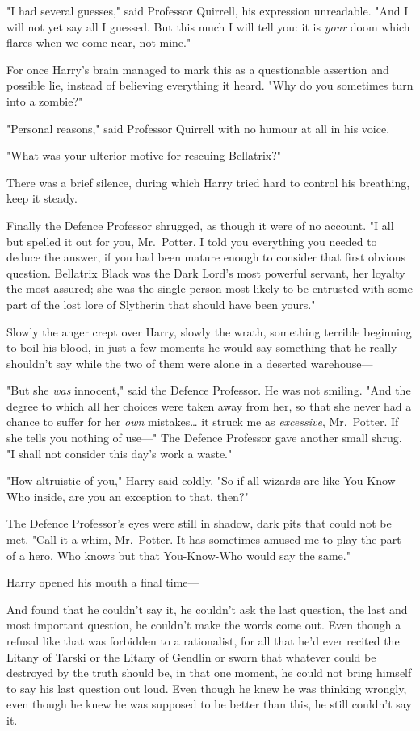 "I had several guesses," said Professor Quirrell, his expression unreadable.
"And I will not yet say all I guessed. But this much I will tell you: it is
\emph{your} doom which flares when we come near, not mine."

For once Harry's brain managed to mark this as a questionable assertion and
possible lie, instead of believing everything it heard. "Why do you sometimes
turn into a zombie?"

"Personal reasons," said Professor Quirrell with no humour at all in his voice.

"What was your ulterior motive for rescuing Bellatrix?"

There was a brief silence, during which Harry tried hard to control his
breathing, keep it steady.

Finally the Defence Professor shrugged, as though it were of no account. "I all
but spelled it out for you, Mr.~Potter. I told you everything you needed to
deduce the answer, if you had been mature enough to consider that first obvious
question. Bellatrix Black was the Dark Lord's most powerful servant, her
loyalty the most assured; she was the single person most likely to be entrusted
with some part of the lost lore of Slytherin that should have been yours."

Slowly the anger crept over Harry, slowly the wrath, something terrible
beginning to boil his blood, in just a few moments he would say something that
he really shouldn't say while the two of them were alone in a deserted
warehouse---

"But she \emph{was} innocent," said the Defence Professor. He was not smiling.
"And the degree to which all her choices were taken away from her, so that she
never had a chance to suffer for her \emph{own} mistakes{\ldots} it struck me
as \emph{excessive}, Mr.~Potter. If she tells you nothing of use---" The
Defence Professor gave another small shrug. "I shall not consider this day's
work a waste."

"How altruistic of you," Harry said coldly. "So if all wizards are like
You-Know-Who inside, are you an exception to that, then?"

The Defence Professor's eyes were still in shadow, dark pits that could not be
met. "Call it a whim, Mr.~Potter. It has sometimes amused me to play the part
of a hero. Who knows but that You-Know-Who would say the same."

Harry opened his mouth a final time---

And found that he couldn't say it, he couldn't ask the last question, the last
and most important question, he couldn't make the words come out. Even though a
refusal like that was forbidden to a rationalist, for all that he'd ever
recited the Litany of Tarski or the Litany of Gendlin or sworn that whatever
could be destroyed by the truth should be, in that one moment, he could not
bring himself to say his last question out loud. Even though he knew he was
thinking wrongly, even though he knew he was supposed to be better than this,
he still couldn't say it.

